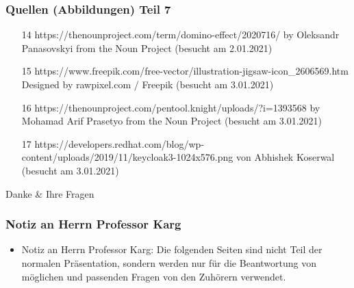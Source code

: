 \documentclass{beamer}
\begin{document}
\begin{frame}
\frametitle{Quellen (Abbildungen) Teil 7}
\begin{itemize}
\item [14] https://thenounproject.com/term/domino-effect/2020716/ by Oleksandr Panasovskyi from the Noun Project (besucht am 2.01.2021)
\item [15] https://www.freepik.com/free-vector/illustration-jigsaw-icon\_2606569.htm Designed by rawpixel.com / Freepik (besucht am 3.01.2021)
\item [16] https://thenounproject.com/pentool.knight/uploads/?i=1393568 by Mohamad Arif Prasetyo from the Noun Project (besucht am 3.01.2021)
\item [17] https://developers.redhat.com/blog/wp-content/uploads/2019/11/keycloak3-1024x576.png von Abhishek Koserwal (besucht am 3.01.2021)
\end{itemize}
\end{frame}

\begin{frame}
\Huge{\centerline{Danke \& Ihre Fragen}}
\end{frame}


\begin{frame} %
\frametitle{Notiz an Herrn Professor Karg}
\begin{itemize}
\item Notiz an Herrn Professor Karg: Die folgenden Seiten sind nicht Teil der normalen Präsentation, sondern werden nur für die Beantwortung von möglichen und passenden Fragen von den Zuhörern verwendet.
\end{itemize}
\end{frame}
\end{document}
